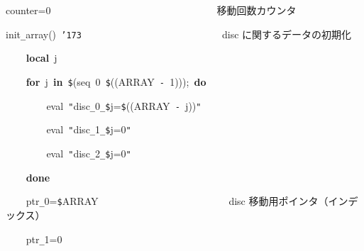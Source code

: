 \documentclass[a4paper,10pt]{article}
\def\mc{\relax}
\begin{document}
\noindent
\mbox{}counter=0{\tt\mc \ }{\tt\mc \ }{\tt\mc \ }{\tt\mc \ }{\tt\mc \ }{\tt\mc \ }{\tt\mc \ }{\tt\mc \ }{\tt\mc \ }{\tt\mc \ }{\tt\mc \ }{\tt\mc \ }{\tt\mc \ }{\tt\mc \ }{\tt\mc \ }{\tt\mc \ }{\tt\mc \ }{\tt\mc \ }{\tt\mc \ }{\tt\mc \ }{\tt\mc \ }{\tt\mc \ }{\tt\mc \ }{\tt\mc \ }{\tt\mc \ }{\tt\mc \ }{\tt\mc \ }{\tt\mc \ }{\tt\mc \ }{\tt\mc \ }{\tt\mc \ }\rm\mc {\tt\#} \ 移動回数カウンタ \hfill 
\tt\mc 

\noindent
\mbox{}\hfill

\noindent
\mbox{}init{\tt\_}array(){\tt\mc \ }{\tt\char'173}{\tt\mc \ }{\tt\mc \ }{\tt\mc \ }{\tt\mc \ }{\tt\mc \ }{\tt\mc \ }{\tt\mc \ }{\tt\mc \ }{\tt\mc \ }{\tt\mc \ }{\tt\mc \ }{\tt\mc \ }{\tt\mc \ }{\tt\mc \ }{\tt\mc \ }{\tt\mc \ }{\tt\mc \ }{\tt\mc \ }{\tt\mc \ }{\tt\mc \ }{\tt\mc \ }{\tt\mc \ }{\tt\mc \ }{\tt\mc \ }{\tt\mc \ }{\tt\mc \ }\rm\mc {\tt\#} \ disc に関するデータの初期化\hfill 
\tt\mc 

\noindent
\mbox{}{\tt\mc \ }{\tt\mc \ }{\tt\mc \ }{\tt\mc \ }\textbf{local}{\tt\mc \ }j

\noindent
\mbox{}{\tt\mc \ }{\tt\mc \ }{\tt\mc \ }{\tt\mc \ }\textbf{for}{\tt\mc \ }j{\tt\mc \ }\textbf{in}{\tt\mc \ }{\tt\$}(seq{\tt\mc \ }0{\tt\mc \ }{\tt\$}((ARRAY{\tt\mc \ }{\tt -}{\tt\mc \ }1)));{\tt\mc \ }\textbf{do}

\noindent
\mbox{}{\tt\mc \ }{\tt\mc \ }{\tt\mc \ }{\tt\mc \ }{\tt\mc \ }{\tt\mc \ }{\tt\mc \ }{\tt\mc \ }eval{\tt\mc \ }{\tt "}disc{\tt\_}0{\tt\_}{\tt\$}j={\tt\$}((ARRAY{\tt\mc \ }{\tt -}{\tt\mc \ }j)){\tt "}

\noindent
\mbox{}{\tt\mc \ }{\tt\mc \ }{\tt\mc \ }{\tt\mc \ }{\tt\mc \ }{\tt\mc \ }{\tt\mc \ }{\tt\mc \ }eval{\tt\mc \ }{\tt "}disc{\tt\_}1{\tt\_}{\tt\$}j=0{\tt "}

\noindent
\mbox{}{\tt\mc \ }{\tt\mc \ }{\tt\mc \ }{\tt\mc \ }{\tt\mc \ }{\tt\mc \ }{\tt\mc \ }{\tt\mc \ }eval{\tt\mc \ }{\tt "}disc{\tt\_}2{\tt\_}{\tt\$}j=0{\tt "}

\noindent
\mbox{}{\tt\mc \ }{\tt\mc \ }{\tt\mc \ }{\tt\mc \ }\textbf{done}

\noindent
\mbox{}{\tt\mc \ }{\tt\mc \ }{\tt\mc \ }{\tt\mc \ }ptr{\tt\_}0={\tt\$}ARRAY{\tt\mc \ }{\tt\mc \ }{\tt\mc \ }{\tt\mc \ }{\tt\mc \ }{\tt\mc \ }{\tt\mc \ }{\tt\mc \ }{\tt\mc \ }{\tt\mc \ }{\tt\mc \ }{\tt\mc \ }{\tt\mc \ }{\tt\mc \ }{\tt\mc \ }{\tt\mc \ }{\tt\mc \ }{\tt\mc \ }{\tt\mc \ }{\tt\mc \ }{\tt\mc \ }{\tt\mc \ }{\tt\mc \ }{\tt\mc \ }\rm\mc {\tt\#} \ disc 移動用ポインタ（インデックス）\hfill 
\tt\mc 

\noindent
\mbox{}{\tt\mc \ }{\tt\mc \ }{\tt\mc \ }{\tt\mc \ }ptr{\tt\_}1=0
\end{document}
